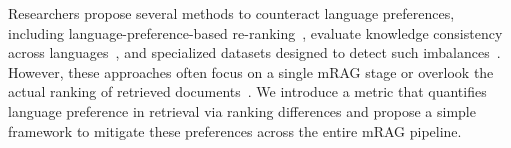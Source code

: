 Researchers propose several methods to counteract language preferences, including language-preference-based re-ranking~\cite{10.1145/3539813.3545131}, evaluate knowledge consistency across languages~\cite{qi-etal-2023-cross}, and specialized datasets designed to detect such imbalances~\cite{li-etal-2024-bordirlines}. However, these approaches often focus on a single mRAG stage or overlook the actual ranking of retrieved documents~\cite{sharma2024fauxpolyglotstudyinformation, 10.1145/3626772.3657943}. We introduce a metric that quantifies language preference in retrieval via ranking differences and propose a simple framework to mitigate these preferences across the entire mRAG pipeline.